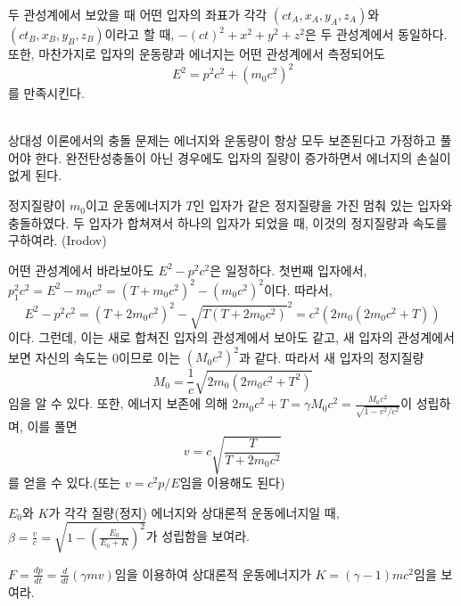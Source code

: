 \begin{theorem}
두 관성계에서 보았을 때 어떤 입자의 좌표가 각각 $(ct_A, x_A, y_A,z_A)$와 $(ct_B, x_B,y_B, z_B)$이라고 할 때, $-(ct)^2 +x^2 +y^2 +z^2$은 두 관성계에서 동일하다. \\
또한, 마찬가지로 입자의 운동량과 에너지는 어떤 관성계에서 측정되어도
\begin{equation}
E^2 = p^2c^2+(m_0c^2)^2
\end{equation}를 만족시킨다.
\end{theorem}

\\
상대성 이론에서의 충돌 문제는 에너지와 운동량이 항상 모두 보존된다고 가정하고 풀어야 한다. 완전탄성충돌이 아닌 경우에도 입자의 질량이 증가하면서 에너지의 손실이 없게 된다.

\begin{example}
정지질량이 $m_0$이고 운동에너지가 $T$인 입자가 같은 정지질량을 가진 멈춰 있는 입자와 충돌하였다. 두 입자가 합쳐져서 하나의 입자가 되었을 때, 이것의 정지질량과 속도를 구하여라. (Irodov)
\end{example}
어떤 관성계에서 바라보아도 $E^2-p^2c^2$은 일정하다. 첫번째 입자에서, $p_1^2c^2 =E^2-m_0c^2 = (T+m_0c^2)^2-(m_0c^2)^2$이다. 따라서,
\begin{equation}
E^2-p^2c^2=(T+2m_0c^2)^2 -\sqrt{T(T+2m_0c^2)}^2=c^2(2m_0(2m_0c^2+T))
\end{equation}
이다. 그런데, 이는 새로 합쳐진 입자의 관성계에서 보아도 같고, 새 입자의 관성계에서 보면 자신의 속도는 0이므로 이는 $(M_0c^2)^2$과 같다. 따라서 새 입자의 정지질량
\begin{equation}
M_0=\frac{1}{c}\sqrt{2m_0(2m_0c^2+T^2)}
\end{equation}
임을 알 수 있다. 또한, 에너지 보존에 의해 $2m_0c^2+T=\gamma M_0c^2=\frac{M_0c^2}{\sqrt{1-v^2/c^2}}$이 성립하며, 이를 풀면 
\begin{equation}
v=c\sqrt{\frac{T}{T+2m_0c^2}}
\end{equation}
를 얻을 수 있다.(또는 $v=c^2p/E$임을 이용해도 된다)
\begin{exercise}
$E_0$와 $K$가 각각 질량(정지) 에너지와 상대론적 운동에너지일 때, $\beta = \frac{v}{c}=\sqrt{1-(\frac{E_0}{E_0+K})^2}$가 성립함을 보여라.
\end{exercise}

\begin{exercise}
$F=\frac{dp}{dt}=\frac{d}{dt}(\gamma m v)$임을 이용하여 상대론적 운동에너지가 $K=(\gamma -1) mc^2$임을 보여라. 
\end{exercise}


